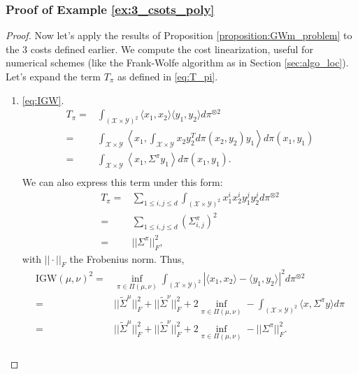 \documentclass{article}
\newcommand{\Y}{\mathcal{Y}}
\newcommand{\X}{\mathcal{X}}
\newcommand{\1}{\mathbf{1}}
\newcommand{\IGW}{\mathrm{IGW}}
\theoremstyle{definition}
\theoremstyle{remark}
\begin{document}
\begin{appendices}
\subsubsection*{Proof of Example \ref{ex:3_csots_poly}}
\begin{proof}
    
    Now let's apply the results of Proposition \ref{proposition:GWm_problem} to the 3 costs defined earlier. We compute the cost linearization, useful for numerical schemes (like the Frank-Wolfe algorithm as in Section \ref{sec:algo_loc}). Let's expand the term $T_\pi$ as defined in \eqref{eq:T_pi}.
\begin{enumerate}
    
        \item \ref{eq:IGW}.  
        \begin{equation*}
            \begin{split}
                T_\pi=&\int_{(\X\times\Y)^2}\langle x_1,x_2\rangle\langle y_1,y_2\rangle d\pi^{\otimes 2}\\
                =&\int_{\X\times\Y}\left\langle x_1, \int_{\X\times\Y}x_2y_2^Td\pi(x_2,y_2)y_1\right\rangle  d\pi(x_1,y_1)\\
                =&\int_{\X\times\Y}\left\langle x_1, \Sigma^\pi y_1\right\rangle  d\pi(x_1,y_1).\\
            \end{split}
        \end{equation*}
        We can also express this term under this form:
        \begin{equation*}
            \begin{split}
                 T_{\pi}=& \sum_{1\leq i,j\leq d} \int_{(\X\times\Y)^2}x_1^ix_2^iy_1^jy_2^jd\pi^{\otimes 2} \\
                 =&\sum_{1\leq i,j\leq d} (\Sigma_{i,j}^\pi)^2 \\
                =&||\Sigma^\pi||^2_F,
            \end{split}
        \end{equation*}
         with $||\cdot||_F$ the Frobenius norm. Thus,
        \begin{equation*}
            \begin{split}
                \IGW(\mu,\nu)^2=&\inf_{\pi\in\Pi(\mu,\nu)}\int_{(\X\times\Y)^2}|\langle x_1,x_2\rangle-\langle y_1,y_2\rangle|^2d\pi^{\otimes 2} \\ 
                =&||\tilde{\Sigma}^{\mu}||_F^2 + ||\tilde{\Sigma}^{\nu}||_F^2 +2\inf_{\pi\in\Pi(\mu,\nu)}-\int_{(\X\times\Y)^2}\langle x,\Sigma^\pi y\rangle d\pi\\
                =&||\tilde{\Sigma}^{\mu}||_F^2 + ||\tilde{\Sigma}^{\nu}||_F^2+2\inf_{\pi\in\Pi(\mu,\nu)}-||\Sigma^\pi||^2_F.\\
            \end{split}
        \end{equation*}


\end{enumerate}
\end{proof}
\end{appendices}
\end{document}

